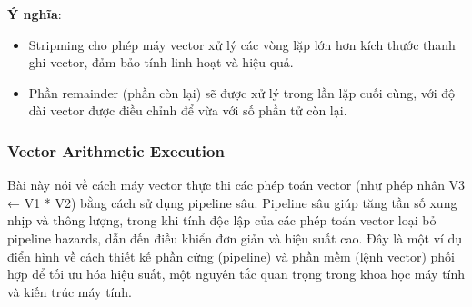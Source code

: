 \documentclass[a4paper]{article}
\begin{document}
\textbf{Ý nghĩa}:
\begin{itemize}
    \item Stripming cho phép máy vector xử lý các vòng lặp lớn hơn kích thước thanh ghi vector, đảm bảo tính linh hoạt và hiệu quả.
    \item  Phần remainder (phần còn lại) sẽ được xử lý trong lần lặp cuối cùng, với độ dài vector được điều chỉnh để vừa với số phần tử còn lại.
\end{itemize}

\subsubsection{Vector Arithmetic Execution}
Bài này nói về cách máy vector thực thi các phép toán vector (như phép nhân V3 ← V1 * V2) bằng cách sử dụng pipeline sâu. Pipeline sâu giúp tăng tần số xung nhịp và thông lượng, trong khi tính độc lập của các phép toán vector loại bỏ pipeline hazards, dẫn đến điều khiển đơn giản và hiệu suất cao. Đây là một ví dụ điển hình về cách thiết kế phần cứng (pipeline) và phần mềm (lệnh vector) phối hợp để tối ưu hóa hiệu suất, một nguyên tắc quan trọng trong khoa học máy tính và kiến trúc máy tính.
\end{document}
